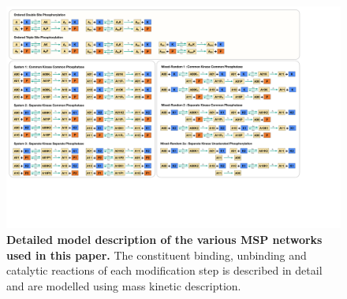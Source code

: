 \documentclass[9pt,lineno]{elife}
\begin{document}
\clearpage
\begin{figure}[ht!]
    \centering
    \includegraphics[width = 0.9\linewidth,  keepaspectratio]{FigS10.pdf}
    \caption{\textbf{Detailed model description of the various MSP networks used in this paper.} The constituent binding, unbinding and catalytic reactions of each modification step is described in detail and are modelled using mass kinetic description.}
    \label{Fig S10}
\end{figure}





% 
\end{document}
